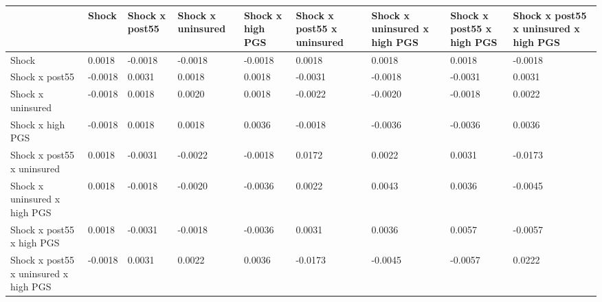 % 
\begin{tabular}{p{5cm}p{2cm}p{2cm}p{2cm}p{2cm}p{2cm}p{2cm}p{2cm}p{2cm}}
  \hline
 & Shock & Shock x post55 & Shock x uninsured & Shock x high PGS & Shock x post55 x uninsured & Shock x uninsured x high PGS &  Shock x post55 x high PGS & Shock x post55 x uninsured x high PGS \\ 
  \hline
Shock & 0.0018 & -0.0018 & -0.0018 & -0.0018 & 0.0018 & 0.0018 & 0.0018 & -0.0018 \\ 
  Shock x post55 & -0.0018 & 0.0031 & 0.0018 & 0.0018 & -0.0031 & -0.0018 & -0.0031 & 0.0031 \\ 
  Shock x uninsured & -0.0018 & 0.0018 & 0.0020 & 0.0018 & -0.0022 & -0.0020 & -0.0018 & 0.0022 \\ 
  Shock x high PGS & -0.0018 & 0.0018 & 0.0018 & 0.0036 & -0.0018 & -0.0036 & -0.0036 & 0.0036 \\ 
  Shock x post55 x uninsured & 0.0018 & -0.0031 & -0.0022 & -0.0018 & 0.0172 & 0.0022 & 0.0031 & -0.0173 \\ 
  Shock x uninsured x high PGS & 0.0018 & -0.0018 & -0.0020 & -0.0036 & 0.0022 & 0.0043 & 0.0036 & -0.0045 \\ 
   Shock x post55 x high PGS & 0.0018 & -0.0031 & -0.0018 & -0.0036 & 0.0031 & 0.0036 & 0.0057 & -0.0057 \\ 
  Shock x post55 x uninsured x high PGS & -0.0018 & 0.0031 & 0.0022 & 0.0036 & -0.0173 & -0.0045 & -0.0057 & 0.0222 \\ 
   \hline
\end{tabular}
